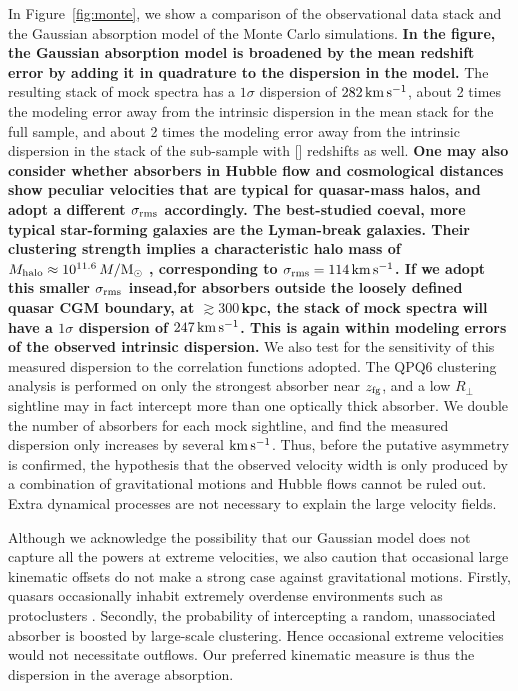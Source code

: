 \documentclass[iop]{emulateapj}
\begin{document}
In Figure~\ref{fig:monte}, we show a comparison of the observational data stack and the Gaussian
absorption model of the Monte Carlo simulations.
{\bf In the figure, the Gaussian absorption model is
broadened by the mean redshift error by adding it in quadrature to the dispersion in the model.}
The resulting stack of mock spectra has a $1\sigma$ dispersion of $282\,{\rm km\,s^{-1}}$,
about 2 times the modeling error away from the intrinsic dispersion in the  mean stack
for the full sample, and about 2 times the modeling error away from the intrinsic dispersion in the
stack of the sub-sample with [] redshifts as well.
{\bf One may also consider whether absorbers in Hubble flow and cosmological distances show peculiar
velocities that are typical for quasar-mass halos, and adopt a different $\sigma_{\rm rms}$ accordingly.
The best-studied coeval, more typical star-forming
galaxies are the Lyman-break galaxies. Their clustering strength implies a characteristic halo
mass of $M_{\rm halo}\approx10^{11.6}\,M/{\rm M_\odot}$ \citep{Bielby+13,Malkan+17}, corresponding to
$\sigma_{\rm rms}=114\,{\rm km\,s^{-1}}$.
If we adopt this smaller $\sigma_{\rm rms}$ insead,for absorbers outside the loosely
defined quasar CGM boundary, at $\gtrsim300$\,kpc, the stack of mock spectra will have a $1\sigma$
dispersion of $247\,{\rm km\,s^{-1}}$. This is again within modeling errors of the observed intrinsic
dispersion.}
We also test for the
sensitivity of this measured dispersion to the correlation functions adopted. The QPQ6 clustering
analysis is performed on only the strongest absorber near $z_{\rm fg}$, and a low $R_\perp$
sightline may in fact intercept more than one optically thick absorber. We double the number of
absorbers for each mock sightline, and find the measured dispersion only increases by several
${\rm km\,s^{-1}}$. Thus, before the putative asymmetry is confirmed, the hypothesis that the
observed velocity width is only produced by a
combination of gravitational motions and Hubble flows cannot be ruled out. Extra dynamical
processes are not necessary to explain the large velocity fields.

Although we acknowledge the possibility that our Gaussian model does not capture all the powers
at extreme velocities, we also caution that occasional large kinematic offsets do not make a strong
case against gravitational motions. Firstly, quasars occasionally inhabit extremely overdense environments
such as protoclusters \citep[e.g.,][]{Hennawi+15}. Secondly, the probability of intercepting a random,
unassociated absorber is boosted by large-scale clustering. Hence occasional extreme velocities would not
necessitate outflows. Our preferred kinematic measure is thus the dispersion in the average absorption.
\end{document}
